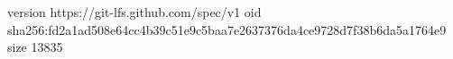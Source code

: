 version https://git-lfs.github.com/spec/v1
oid sha256:fd2a1ad508e64cc4b39c51e9c5baa7e2637376da4ce9728d7f38b6da5a1764e9
size 13835
